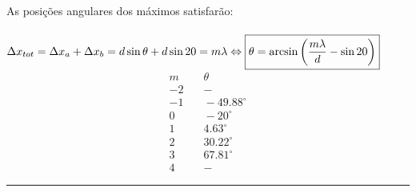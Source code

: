 As posições angulares dos máximos satisfarão:\\\\
$
\Delta x_{tot}=\Delta x_a+\Delta x_b =d\sin\theta+d\sin20=m\lambda\\
\\
\Leftrightarrow\boxed{\theta=\arcsin\left (\frac{m\lambda}{d}-\sin20 \right )}\\
\\
$
\begin{align*}
	m &\quad \theta\\
	-2 &\quad  -\\
	-1 &\quad -49.88^\circ\\
	0 &\quad -20^\circ\\
	1 &\quad 4.63^\circ\\
	2 &\quad 30.22^\circ\\
	3 &\quad 67.81^\circ\\
	4 &\quad -
\end{align*}
\hrule
%

